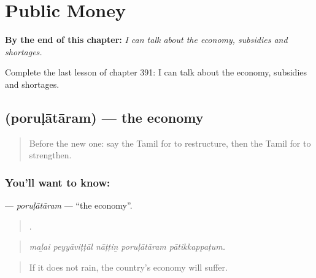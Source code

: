 
\chapter{Public Money}
\label{ch:ta-public-money}

\begin{chapteropening}
\textbf{By the end of this chapter:} \emph{I can talk about the economy, subsidies and shortages.}

Complete the last lesson of chapter 391: I can talk about the economy, subsidies and shortages.
\end{chapteropening}

\section[\texorpdfstring{\ta{பொருளாதாரம்} (poruḷātāram)}{பொருளாதாரம் (poruḷātāram)}]{ (poruḷātāram) — the economy}

\label{lesson:TA-C391-porulataram}



\begin{quote}
Before the new one: say the Tamil for to restructure, then the Tamil for to strengthen.
\end{quote}

\subsection*{You'll want to know: }
\textbf{} — \emph{poruḷātāram} — \textquotedblleft{}the economy\textquotedblright{}.

\begin{quote}
    .
\end{quote}

\begin{quote}
\emph{maḻai peyyāviṭṭāl nāṭṭiṉ poruḷātāram pātikkappaṭum.}
\end{quote}

\begin{quote}
If it does not rain, the country's economy will suffer.
\end{quote}

